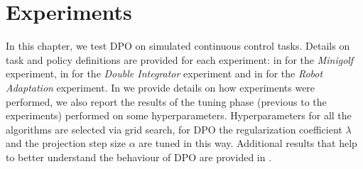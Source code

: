 \chapter{Experiments} \label{chap:exp}
In this chapter, we test \ac{DPO} on simulated continuous control tasks. Details on task and policy definitions are provided for each experiment: in  for the \emph{Minigolf} experiment, in  for the \emph{Double Integrator} experiment and in  for the \emph{Robot Adaptation} experiment. In  we provide details on how experiments were performed, we also report the results of the tuning phase (previous to the experiments) performed on some hyperparameters. Hyperparameters for all the algorithms are selected via grid search, for \ac{DPO} the regularization coefficient $\lambda$ and the projection step size $\alpha$ are tuned in this way. Additional results that help to better understand the behaviour of \ac{DPO} are provided in .

